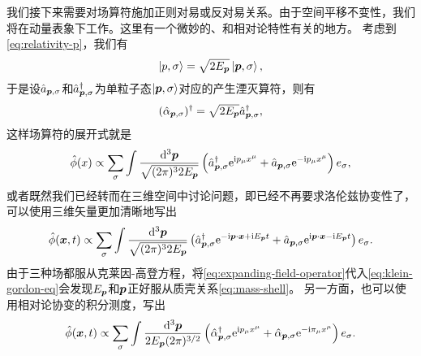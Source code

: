 \documentclass[hyperref, UTF8, a4paper]{ctexart}
\newcommand*{\ii}{\mathrm{i}}
\newcommand*{\ee}{\mathrm{e}}
\begin{document}
我们接下来需要对场算符施加正则对易或反对易关系。由于空间平移不变性，我们将在动量表象下工作。这里有一个微妙的、和相对论特性有关的地方。
考虑到\eqref{eq:relativity-p}，我们有
\[
    \ket{p, \sigma} = \sqrt{2 E_{\vb*{p}}} \ket{\vb*{p}, \sigma},
\]
于是设$\hat{a}_{\vb*{p}, \sigma}$和$\hat{a}^\dagger_{\vb*{p}, \sigma}$为单粒子态$\ket{\vb*{p}, \sigma}$对应的产生湮灭算符，则有
\[
    (\hat{\alpha}_{\vb*{p}, \sigma})^\dagger = \sqrt{2E_{\vb*{p}}} \hat{a}_{\vb*{p}, \sigma}^\dagger,
\]
这样场算符的展开式就是
\[
    \hat{\phi}(x) \propto \sum_\sigma \int \frac{\dd[3]{\vb*{p}}}{\sqrt{(2\pi)^3 2 E_{\vb*{p}}}} \left( \hat{a}^\dagger_{\vb*{p}, \sigma} \ee^{\ii p_\mu x^\mu} + \hat{a}_{\vb*{p}, \sigma} \ee^{- \ii p_\mu x^\mu} \right) e_\sigma,
\]
或者既然我们已经转而在三维空间中讨论问题，即已经不再要求洛伦兹协变性了，可以使用三维矢量更加清晰地写出
\begin{equation}
    \hat{\phi}(\vb*{x}, t) \propto \sum_\sigma \int \frac{\dd[3]{\vb*{p}}}{\sqrt{(2\pi)^3 2 E_{\vb*{p}}}} \left( \hat{a}^\dagger_{\vb*{p}, \sigma} \ee^{- \ii \vb*{p} \cdot \vb*{x} + \ii E_{\vb*{p}} t} + \hat{a}_{\vb*{p}, \sigma} \ee^{\ii \vb*{p} \cdot \vb*{x} - \ii E_{\vb*{p}} t} \right) e_\sigma. 
    \label{eq:expanding-field-operator}
\end{equation}
由于三种场都服从克莱因-高登方程，将\eqref{eq:expanding-field-operator}代入\eqref{eq:klein-gordon-eq}会发现$E_{\vb*{p}}$和$\vb*{p}$正好服从质壳关系\eqref{eq:mass-shell}。
另一方面，也可以使用相对论协变的积分测度，写出
\begin{equation}
    \hat{\phi}(\vb*{x}, t) \propto \sum_\sigma \int \frac{\dd[3]{\vb*{p}}}{2 E_{\vb*{p}} (2\pi)^{3/2}} \left( \hat{\alpha}^\dagger_{\vb*{p}, \sigma} \ee^{ \ii p_\mu x^\mu} + \hat{\alpha}_{\vb*{p}, \sigma} \ee^{- \ii \pi_\mu x^\mu} \right) e_\sigma. 
    \label{eq:expanding-field-operator-relativity}
\end{equation}
\end{document}
